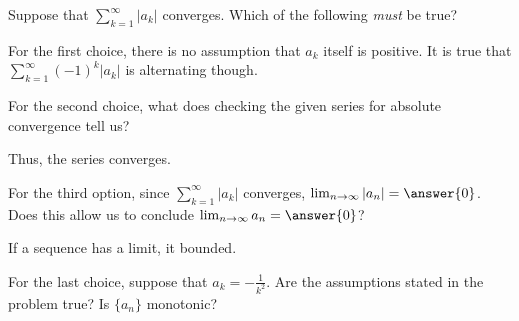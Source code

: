 \documentclass{ximera}
\author{Jim Talamo}
\begin{document}
\begin{exercise}
Suppose that $\sum_{k=1}^{\infty} |a_k|$ converges.  Which of the following \emph{must} be true?  

\begin{selectAll}
\end{selectAll}

\begin{hint}
\begin{question}
For the first choice, there is no assumption that $a_k$ itself is positive.  It is true that $\sum_{k=1}^{\infty} (-1)^k |a_k|$ is alternating though.
\end{question}

\begin{question}
For the second choice, what does checking the given series for absolute convergence tell us?

\begin{multipleChoice}
\end{multipleChoice}
Thus, the series converges.
\end{question}

\begin{question}
For the third option, since $\sum_{k=1}^{\infty} |a_k|$ converges, $\lim_{n \to \infty} |a_n| = \answer{0}$.  Does this allow us to conclude $\lim_{n \to \infty} a_n = \answer{0}$?
\end{question}

\begin{question}
If a sequence has a limit, it  bounded.
\end{question}

\begin{question}
For the last choice, suppose that $a_k = -\frac{1}{k^2}$.   Are the assumptions stated in the problem true?  Is $\{a_n\}$ monotonic?
\end{question}

\end{hint}

\end{exercise}
\end{document}
